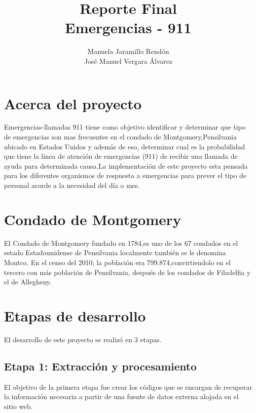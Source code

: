 \documentclass[11pt]{article}
\title{\textbf{Reporte Final \\Emergencias - 911}}
\author{Manuela Jaramillo Rendón\\
		José Manuel Vergara Álvarez\\
		}
\date{}
\begin{document}
\maketitle

\section{Acerca del proyecto}
Emergencias-llamadas 911 tiene como  objetivo   identificar y determinar que tipo de emergencias son mas frecuentes  en el condado de Montgomery,Pensilvania ubicado en Estados Unidos y además de eso, determinar cual es la probabilidad que tiene la linea de atención de emergencias (911) de recibir una llamada de ayuda para determinada causa.La implementación de este proyecto esta pensada para los diferentes organismos de respuesta a emergencias para prever el tipo de personal acorde a la necesidad del día o mes.
\section{Condado de Montgomery}
El Condado de Montgomery fundado en 1784,es uno de los 67 condados en el estado Estadounidense de Pensilvania localmente también se le denomina Montco. En el censo del 2010; la población era 799.874,convirtiendolo en el tercero con más población de Pensilvania, después de los condados de Filadelfia y el de Allegheny.
\section{Etapas de desarrollo}
El desarrollo de este proyecto se realizó en 3 etapas.
\subsection{Etapa 1: Extracción y procesamiento}
El objetivo de la primera etapa fue crear los códigos que se encargan de recuperar la información necesaria a partir de una fuente de datos externa alojada en el sitio web.
\end{document}
